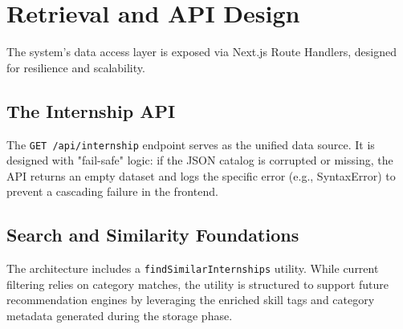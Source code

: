 \section{Retrieval and API Design}
The system's data access layer is exposed via Next.js Route Handlers, designed for resilience and scalability.

\subsection{The Internship API}
The \texttt{GET /api/internship} endpoint serves as the unified data source. It is designed with "fail-safe" logic: if the JSON catalog is corrupted or missing, the API returns an empty dataset and logs the specific error (e.g., SyntaxError) to prevent a cascading failure in the frontend.

\subsection{Search and Similarity Foundations}
The architecture includes a \texttt{findSimilarInternships} utility. While current filtering relies on category matches, the utility is structured to support future recommendation engines by leveraging the enriched skill tags and category metadata generated during the storage phase.
